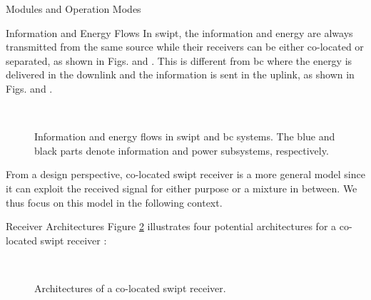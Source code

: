 \begin{section}{}
	\begin{subsection}{Modules and Operation Modes}
		\begin{subsubsection}{Information and Energy Flows}
			In \gls{swipt}, the information and energy are always transmitted from the same source while their receivers can be either co-located or separated, as shown in Figs.  and .
			This is different from \gls{bc} where the energy is delivered in the downlink and the information is sent in the uplink, as shown in Figs.  and .
			\begin{figure}[H]
				\centering
				\\
				\caption{
					Information and energy flows in \gls{swipt} and \gls{bc} systems. The blue and black parts denote information and power subsystems, respectively.
				}
				\label{fg:wipt_schemes}
			\end{figure}
			From a design perspective, co-located \gls{swipt} receiver is a more general model since it can exploit the received signal for either purpose or a mixture in between.
			We thus focus on this model in the following context.
		\end{subsubsection}

		\begin{subsubsection}{Receiver Architectures}\label{sc:receiver_architectures}
			Figure \ref{fg:swipt_receiver_architectures} illustrates four potential architectures for a co-located \gls{swipt} receiver \cite{Clerckx2022}:
			\begin{figure}[H]
				\centering
				\\
				\caption{
					Architectures of a co-located \gls{swipt} receiver.
				}
				\label{fg:swipt_receiver_architectures}
			\end{figure}


\end{subsubsection}
\end{subsection}
\end{section}
